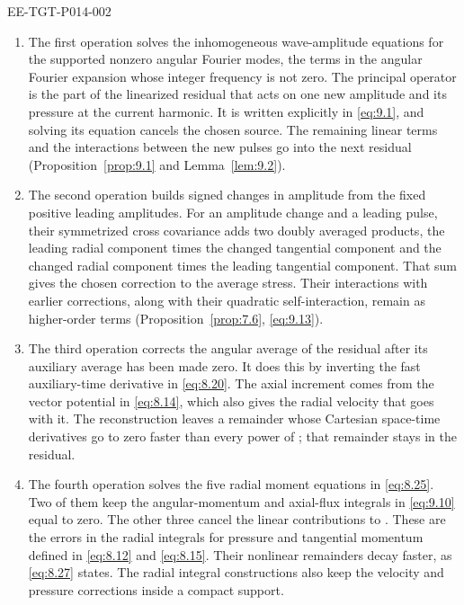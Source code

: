 \begin{EESegment}{EE-TGT-P014-002}
\begin{enumerate}[label=\arabic*.,leftmargin=*]
\item The first operation solves the inhomogeneous wave-amplitude equations for the
supported nonzero angular Fourier modes, the terms in the angular Fourier expansion whose integer
frequency is not zero. The principal operator is the part of the linearized residual that acts on
one new amplitude and its pressure at the current harmonic. It is written explicitly in
\eqref{eq:9.1}, and solving its equation cancels the chosen source. The remaining linear terms and the interactions between the new pulses go
into the next residual (Proposition~\ref{prop:9.1} and Lemma~\ref{lem:9.2}).
\item The second operation builds signed changes in amplitude from the fixed positive
leading amplitudes. For an amplitude change and a leading pulse, their symmetrized cross
covariance adds two doubly averaged products, the leading radial component times the changed
tangential component and the changed radial component times the leading tangential component.
That sum gives the chosen correction to the average stress. Their interactions with earlier
corrections, along with their quadratic self-interaction, remain as higher-order
terms (Proposition~\ref{prop:7.6}, \eqref{eq:9.13}).
\item The third operation corrects the angular average of the residual after its auxiliary
average has been made zero. It does this by inverting the fast auxiliary-time derivative in
\eqref{eq:8.20}. The axial increment comes from the vector potential in \eqref{eq:8.14},
which also gives the radial velocity that goes with it. The reconstruction leaves a remainder
whose Cartesian space-time derivatives go to zero faster than every power of
; that remainder stays in the residual.
\item The fourth operation solves the five radial moment equations in \eqref{eq:8.25}.
Two of them keep the angular-momentum and axial-flux integrals in \eqref{eq:9.10} equal to
zero. The other three cancel the linear contributions to
. These are the errors in the
radial integrals for pressure and tangential momentum defined in \eqref{eq:8.12} and
\eqref{eq:8.15}. Their nonlinear remainders decay faster, as \eqref{eq:8.27} states. The
radial integral constructions also keep the velocity and pressure corrections inside a
compact support.
\end{enumerate}
\end{EESegment}

